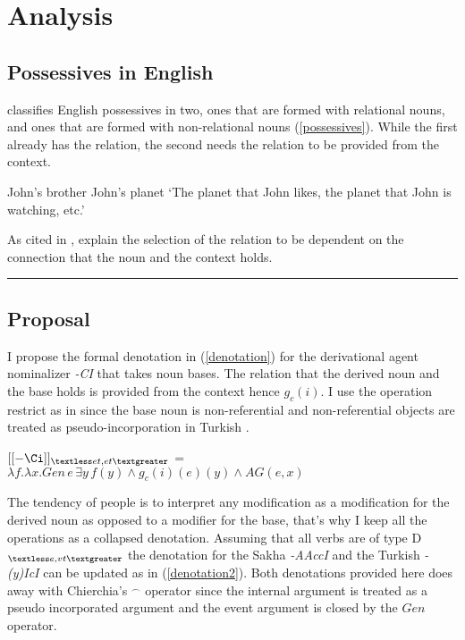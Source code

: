 \section{Analysis}
    
    \subsection{Possessives in English}
    
\cite{barker2011possessives} classifies English possessives in two, ones that are formed with relational nouns, and ones that are formed with non-relational nouns (\ref{possessives}). While the first already has the relation, the second needs the relation to be provided from the context. 
    
    \begin{exe}
    \ex \label{possessives} \begin{xlist}
    \ex John's brother 
    \ex John's planet \glt `The planet that John likes, the planet that John is watching, etc.'
    \end{xlist}
    \end{exe}
    
As cited in \cite{barker2011possessives}, \cite{vikner2002semantic} explain the selection of the relation to be dependent on the connection that the noun and the context holds.
    
    \rule{\columnwidth}{0.2pt}
    
    \subsection{Proposal}
I propose the formal denotation in (\ref{denotation}) for the derivational agent nominalizer \textit{-CI} that takes noun bases. The relation that the derived noun and the base holds is provided from the context hence $g_c(i)$. I use the operation restrict as in \cite{dayal2003semantics} since the base noun is non-referential and non-referential objects are treated as pseudo-incorporation in Turkish \citep{ozturk2009incorporating}. 
    
    \begin{exe}
    \ex \label{denotation} 
    $[[-{\Ci}]]_{\textless et,et \textgreater}$ = $\lambda{f}.\lambda{x}.Gen\,e\,\exists{y}\, f(y) \wedge g_c(i)(e)(y) \wedge AG(e,x)$
    \end{exe}
    
The tendency of people is to interpret any modification as a modification for the derived noun as opposed to a modifier for the base, that's why I keep all the operations as a collapsed denotation. Assuming that all verbs are of type D$_{\textless e,vt\textgreater}$ the denotation for the Sakha \textit{-AAccI} and the Turkish \textit{-(y)IcI} can be updated as in (\ref{denotation2}). Both denotations provided here does away with Chierchia's $^{\frown}$ operator since the internal argument is treated as a pseudo incorporated argument and the event argument is closed by the  $Gen$ operator.

